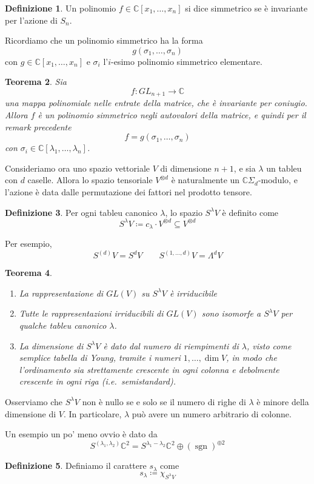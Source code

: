 \documentclass[a4paper, 11pt]{article}
\theoremstyle{definition}
\newtheorem{Def}{Definizione}[section]
\theoremstyle{plain}
\newtheorem{Teo}[Def]{Teorema}
\newcommand{\C}{\mathbb{C}}
\newcommand{\deff}{\coloneqq}
\DeclareMathOperator{\sgn}{sgn}
\begin{document}
\begin{Def}
	Un polinomio $f \in \C[x_1, \dots, x_n]$ si dice simmetrico se è invariante per l'azione di $S_n$.
\end{Def}
Ricordiamo che un polinomio simmetrico ha la forma 
\[
	g(\sigma_1, \dots, \sigma_n)
\]
con $g \in \C[x_1, \dots, x_n]$ e $\sigma_i$ l'$i$-esimo polinomio simmetrico elementare.
\begin{Teo}
	Sia 
	\[
		f \colon GL_{n+1} \to \C
	\]
	una mappa polinomiale nelle entrate della matrice, che è invariante per coniugio. Allora $f$ è un polinomio simmetrico negli autovalori della matrice, e quindi per il remark precedente
	\[
		f = g(\sigma_1, \dots, \sigma_n)
	\]
	con $\sigma_i \in \C[\lambda_1, \dots, \lambda_n]$.
\end{Teo}

Consideriamo ora uno spazio vettoriale $V$ di dimensione $n+1$, e sia $\lambda$ un tableu con $d$ caselle. Allora lo spazio tensoriale $V^{\otimes d}$ è naturalmente un $\C \Sigma_d$-modulo, e l'azione è data dalle permutazione dei fattori nel prodotto tensore. 

\begin{Def}
Per ogni tableu canonico $\lambda$, lo spazio $S^\lambda V$ è definito come
\[
	S^\lambda V \deff c_\lambda \cdot V^{\otimes d} \subseteq V^{\otimes d}
\]
\end{Def}
Per esempio, 
\[
	S^{(d)}V = S^d V\qquad S^{(1,\dots, d)}V = \Lambda^d V
\]
\begin{Teo}
	\begin{enumerate}
		\item La rappresentazione di $GL(V)$ su $S^\lambda V$ è irriducibile 
		\item Tutte le rappresentazioni irriducibili di $GL(V)$ sono isomorfe a $S^\lambda V$ per  qualche tableu canonico $\lambda$.
		\item La dimensione di $S^\lambda V$ è dato dal numero di riempimenti di $\lambda$, visto come semplice tabella di Young, tramite i numeri $1, \dots, \dim V$, in modo che l'ordinamento sia strettamente crescente in ogni colonna e debolmente crescente in ogni riga (i.e.\ \emph{semistandard}).
	\end{enumerate}
\end{Teo}

Osserviamo che $S^\lambda V$ non è nullo se e solo se il numero di righe di $\lambda$ è minore della dimensione di $V$. In particolare, $\lambda$ può avere un numero arbitrario di colonne.

Un esempio un po' meno ovvio è dato da
\[
	S^{(\lambda_1, \lambda_2)}\C^2 = S^{\lambda_1-\lambda_2}\C^2 \oplus (\sgn)^{\oplus 2}
\]
\begin{Def}
	Definiamo il carattere $s_\lambda$ come
	\[
		s_\lambda \deff \chi_{S^\lambda V}
	\]
\end{Def}
\end{document}
